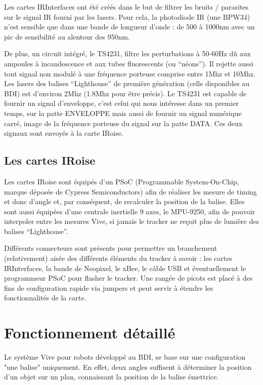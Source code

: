 Les cartes IRInterfaces ont été créés dans le but de filtrer les bruits / parasites sur le signal IR fourni par les lasers. Pour cela, la photodiode IR (une BPW34) n'est sensible que dans une bande de longueur d'onde : de 500 à 1000nm avec un pic de sensibilité au alentour des 950nm.

De plus, un circuit intégré, le TS4231, filtre les perturbations à 50-60Hz dû aux ampoules à incandescence et aux tubes fluorescents (ou "`néons"'). Il rejette aussi tout signal non modulé à une fréquence porteuse comprise entre 1Mhz et 10Mhz. Les lasers des balises "`Lighthouse"' de première génération (celle disponibles au BDI) est d'environ 2Mhz (1.8Mhz pour être précis). Le TS4231 est capable de fournir un signal d'enveloppe, c'est celui qui nous intéresse dans un premier temps, sur la patte ENVELOPPE mais aussi de fournir un signal numérique carré, image de la fréquence porteuse du signal sur la patte DATA. Ces deux signaux sont envoyés à la carte IRoise.


\subsection{Les cartes IRoise}

Les cartes IRoise sont équipés d'un PSoC (Programmable System-On-Chip, marque déposée de Cypress Semiconductors) afin de réaliser les mesure de timing et donc d'angle et, par conséquent, de recalculer la position de la balise. Elles sont aussi équipées d'une centrale inertielle 9 axes, le MPU-9250, afin de pouvoir interpoler entre les mesures Vive, si jamais le tracker ne reçoit plus de lumière des balises "`Lighthouse"'.

Différents connecteurs sont présents pour permettre un branchement (relativement) aisée des différents éléments du tracker à savoir : les cartes IRInterfaces, la bande de Neopixel, le xBee, le câble USB et éventuellement le programmeur PSoC pour flasher le tracker. Une rangée de picots est placé à des fins de configuration rapide via jumpers et peut servir à étendre les fonctionnalités de la carte.


\section{Fonctionnement détaillé}

Le système Vive pour robots développé au BDI, se base sur une configuration "une balise" uniquement. En effet, deux angles suffisent à déterminer la position d'un objet sur un plan, connaissant la position de la balise émettrice.
